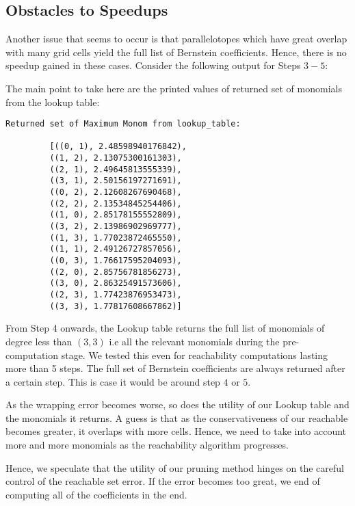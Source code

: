 \subsection{Obstacles to Speedups}
Another issue that seems to occur is that parallelotopes which have great overlap with many grid cells yield the full list of Bernstein coefficients. Hence, there is no speedup gained in these cases. Consider the following output for Steps $3-5$:
%

The main point to take here are the printed values of returned set of monomials from the lookup table:
%
\begin{verbatim}
Returned set of Maximum Monom from lookup_table:

         [((0, 1), 2.48598940176842),
         ((1, 2), 2.13075300161303),
         ((2, 1), 2.49645813555339),
         ((3, 1), 2.50156197271691),
         ((0, 2), 2.12608267690468),
         ((2, 2), 2.13534845254406),
         ((1, 0), 2.85178155552809),
         ((3, 2), 2.13986902969777),
         ((1, 3), 1.77023872465550),
         ((1, 1), 2.49126727857056),
         ((0, 3), 1.76617595204093),
         ((2, 0), 2.85756781856273),
         ((3, 0), 2.86325491573606),
         ((2, 3), 1.77423876953473),
         ((3, 3), 1.77817608667862)]
\end{verbatim}
%
From Step 4 onwards, the Lookup table returns the full list of monomials of degree less than $(3,3)$ i.e all the relevant monomials during the pre-computation stage.
%
We tested this even for reachability computations lasting more than 5 steps. The full set of Bernstein coefficients are always returned after a certain step. This is case it would be around step $4$ or $5$.

As the wrapping error becomes worse, so does the utility of our Lookup table and the monomials it returns. A guess is that as the conservativeness of our reachable becomes greater, it overlaps with more cells. Hence, we need to take into account more and more monomials as the reachability algorithm progresses.

Hence, we speculate that the utility of our pruning method hinges on the careful control of the reachable set error. If the error becomes too great, we end of computing all of the coefficients in the end.
